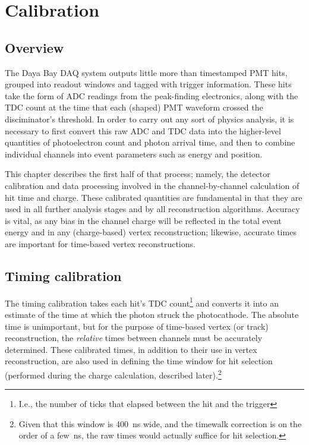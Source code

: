 \documentclass[../thesis.tex]{subfiles}
\begin{document}
\chapter{Calibration}
\label{chap:calib}

\section{Overview}

The Daya Bay DAQ system outputs little more than timestamped PMT hits, grouped into readout windows and tagged with trigger information. These hits take the form of ADC readings from the peak-finding electronics, along with the TDC count at the time that each (shaped) PMT waveform crossed the disciminator's threshold. In order to carry out any sort of physics analysis, it is necessary to first convert this raw ADC and TDC data into the higher-level quantities of photoelectron count and photon arrival time, and then to combine individual channels into event parameters such as energy and position.

This chapter describes the first half of that process; namely, the detector calibration and data processing involved in the channel-by-channel calculation of hit time and charge. These calibrated quantities are fundamental in that they are used in all further analysis stages and by all reconstruction algorithms. Accuracy is vital, as any bias in the channel charge will be reflected in the total event energy and in any (charge-based) vertex reconstruction; likewise, accurate times are important for time-based vertex reconstructions.

\section{Timing calibration}

The timing calibration takes each hit's TDC count\footnote{I.e., the number of ticks that elapsed between the hit and the trigger} and converts it into an estimate of the time at which the photon struck the photocathode. The absolute time is unimportant, but for the purpose of time-based vertex (or track) reconstruction, the \emph{relative} times between channels must be accurately determined. These calibrated times, in addition to their use in vertex reconstruction, are also used in defining the time window for hit selection (performed during the charge calculation, described later).\footnote{Given that this window is 400~ns wide, and the timewalk correction is on the order of a few~ns, the raw times would actually suffice for hit selection.} 
\end{document}

